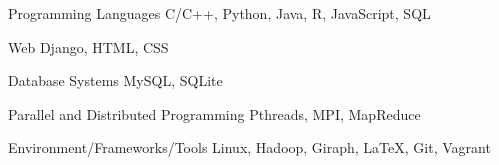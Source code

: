 

\begin{cvskills}

  \cvskill
    {Programming Languages} %
    {C/C++, Python, Java, R, JavaScript, SQL} %

  \cvskill
    {Web} %
    {Django, HTML, CSS} %

  \cvskill
    {Database Systems} %
    {MySQL, SQLite} %

  \cvskill
    {Parallel and Distributed Programming} %
    {Pthreads, MPI, MapReduce} %

  \cvskill
    {Environment/Frameworks/Tools} %
    {Linux, Hadoop, Giraph, \LaTeX, Git, Vagrant} %

\end{cvskills}
